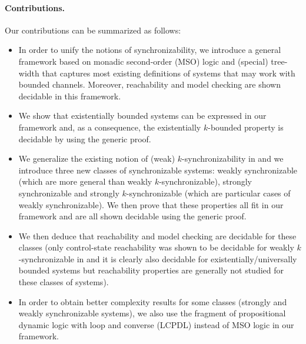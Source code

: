 \documentclass[a4paper,UKenglish,cleveref, autoref, thm-restate]{lipics-v2021}
\begin{document}
\paragraph*{Contributions.}
Our contributions can be summarized as follows:
\begin{itemize}
\item
In order to unify the notions of synchronizability, we introduce a general
framework based on monadic second-order (MSO) logic and (special) tree-width
that captures most existing definitions of systems that may work with bounded
channels. %
Moreover, reachability and model
checking are shown decidable in this framework.
\item We show that existentially %
bounded systems can be expressed in our framework and, as a consequence, the existentially %
$k$-bounded property is decidable by using the  generic proof.

\item We generalize the existing notion of (weak) $k$-synchronizability in \cite{DBLP:conf/cav/BouajjaniEJQ18}
and we introduce three new classes of synchronizable systems: weakly synchronizable (which are more general than weakly $k$-synchronizable), strongly synchronizable and strongly $k$-synchronizable (which are particular cases of weakly synchronizable). We then prove that these properties all fit in our framework and are all shown decidable using the  generic proof.
%

\item We then deduce that reachability and model
checking are decidable for these classes
(only control-state reachability was shown to be decidable for weakly $k$-synchronizable  in \cite{DBLP:conf/cav/BouajjaniEJQ18} and it is clearly also decidable for existentially/universally bounded systems but reachability properties are generally not studied for these classes of systems).

\item In order to obtain better complexity results for some classes (strongly and weakly synchronizable systems), we also use the fragment of propositional dynamic logic with loop and converse (LCPDL) instead of MSO logic in our framework.
%


\end{itemize}
\end{document}
